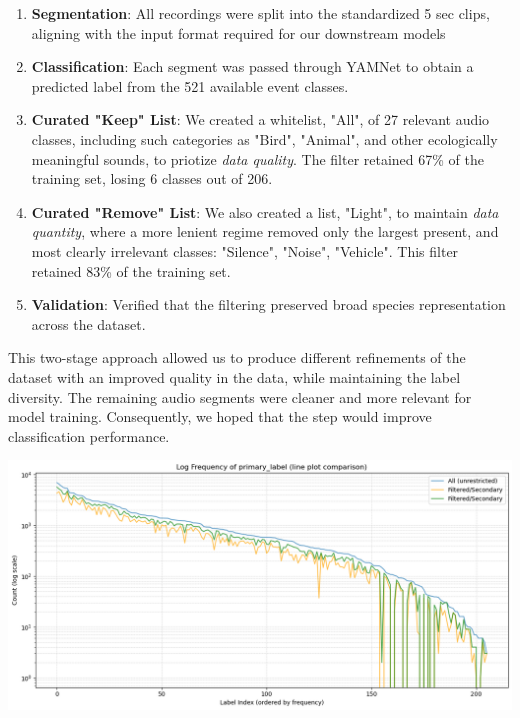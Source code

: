 \documentclass[10pt]{article}
\begin{document}
\begin{enumerate}
  \item \textbf{Segmentation}: All recordings were split into the standardized 5 sec clips, aligning with the input format required for our downstream models
  \item \textbf{Classification}: Each segment was passed through YAMNet to obtain a predicted label from the 521 available event classes.
  \item \textbf{Curated "Keep" List}: We created a whitelist, "All", of 27 relevant audio classes, including such categories as "Bird", "Animal", and other ecologically meaningful sounds, to priotize \textit{data quality}. The filter retained 67\% of the training set, losing 6 classes out of 206.
  \item \textbf{Curated "Remove" List}: We also created a list, "Light", to maintain \textit{data quantity}, where a more lenient regime removed only the largest present, and most clearly irrelevant classes: "Silence", "Noise", "Vehicle". This filter retained 83\% of the training set.
  \item \textbf{Validation}: Verified that the filtering preserved broad species representation across the dataset.
\end{enumerate}

\begin{minipage}{0.48\linewidth}
This two-stage approach allowed us to produce different refinements of the dataset with an improved quality in the data, while maintaining the label diversity. The remaining audio segments were cleaner and more relevant for model training. Consequently, we hoped that the step would improve classification performance.
\end{minipage}
\hfill
\begin{minipage}{0.48\linewidth}
  \includegraphics[width=\linewidth]{img/primary_yamnet_filtering.png}
\end{minipage}
\end{document}
